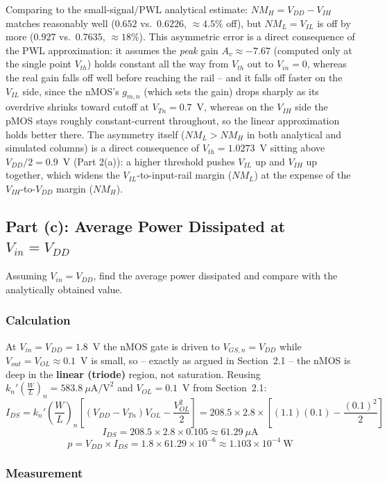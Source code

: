 Comparing to the small-signal/PWL analytical estimate: $NM_H=V_{DD}-V_{IH}$
matches reasonably well ($0.652$ vs.\ $0.6226$, $\approx4.5\%$ off), but
$NM_L=V_{IL}$ is off by more ($0.927$ vs.\ $0.7635$, $\approx18\%$). This
asymmetric error is a direct consequence of the PWL approximation: it assumes
the \emph{peak} gain $A_v\approx-7.67$ (computed only at the single point
$V_{th}$) holds constant all the way from $V_{th}$ out to $V_{in}=0$, whereas
the real gain falls off well before reaching the rail -- and it falls off faster
on the $V_{IL}$ side, since the nMOS's $g_{m,n}$ (which sets the gain) drops
sharply as its overdrive shrinks toward cutoff at $V_{Tn}=0.7$~V, whereas on the
$V_{IH}$ side the pMOS stays roughly constant-current throughout, so the linear
approximation holds better there. The asymmetry itself ($NM_L>NM_H$ in both
analytical and simulated columns) is a direct consequence of $V_{th}=1.0273$~V
sitting above $V_{DD}/2=0.9$~V (Part 2(a)): a higher threshold pushes $V_{IL}$
up and $V_{IH}$ up together, which widens the $V_{IL}$-to-input-rail margin
($NM_L$) at the expense of the $V_{IH}$-to-$V_{DD}$ margin ($NM_H$).

\subsection{Part (c): Average Power Dissipated at $V_{in} = V_{DD}$}

Assuming $V_{in} = V_{DD}$, find the average power dissipated and compare with
the analytically obtained value.

\subsubsection{Calculation}

At $V_{in}=V_{DD}=1.8$~V the nMOS gate is driven to $V_{GS,n}=V_{DD}$ while
$V_{out}=V_{OL}\approx0.1$~V is small, so -- exactly as argued in
Section~2.1 -- the nMOS is deep in the \textbf{linear (triode)} region, not
saturation. Reusing $k_n'\left(\frac{W}{L}\right)_n=583.8\ \mu\text{A/V}^2$ and
$V_{OL}=0.1$~V from Section~2.1:
\[
I_{DS} = k_n'\left(\frac{W}{L}\right)_n\left[(V_{DD}-V_{Tn})V_{OL} -
\frac{V_{OL}^2}{2}\right]
= 208.5\times2.8\times\left[(1.1)(0.1)-\frac{(0.1)^2}{2}\right]
\]
\[
I_{DS} = 208.5\times2.8\times0.105 \approx 61.29\ \mu\text{A}
\]
\[
p = V_{DD} \times I_{DS} = 1.8 \times 61.29\times 10^{-6} \approx 1.103
\times 10^{-4}\ \text{W}
\]
\subsubsection{Measurement}

